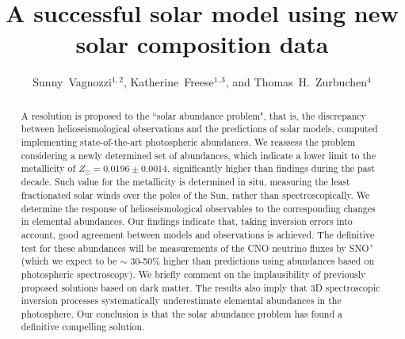 \documentclass[aps,prl,twocolumn,showpacs]{revtex4}
\begin{document}
\title{A successful solar model using new solar composition data}

\author{
\mbox{Sunny Vagnozzi{$^{1,2}$},}
\mbox{Katherine Freese{$^{1,3}$},}
and
\mbox{Thomas H. Zurbuchen{$^{4}$}}
}


\begin{abstract} \noindent

A resolution is proposed to the ``solar abundance problem", that is, the discrepancy between helioseismological observations and the predictions of solar models, computed implementing state-of-the-art photospheric abundances. We reassess the problem considering a newly determined set of abundances, which indicate a lower limit to the metallicity of $Z_{\odot} = 0.0196 \pm 0.0014$, significantly higher than findings during the past decade. Such value for the metallicity is determined in situ, measuring the least fractionated solar winds over the poles of the Sun, rather than spectroscopically. We determine the response of helioseismological observables to the corresponding changes in elemental abundances. Our findings indicate that, taking inversion errors into account, good agreement between models and observations is achieved. The definitive test for these abundances will be measurements of the CNO neutrino fluxes by SNO$^+$ (which we expect to be $\sim$ 30-50\% higher than predictions using abundances based on photospheric spectroscopy). We briefly comment on the implausibility of previously proposed solutions based on dark matter. The results also imply that 3D spectroscopic inversion processes systematically underestimate elemental abundances in the photosphere. Our conclusion is that the solar abundance problem has found a definitive compelling solution.

\end{abstract}

\end{document}
